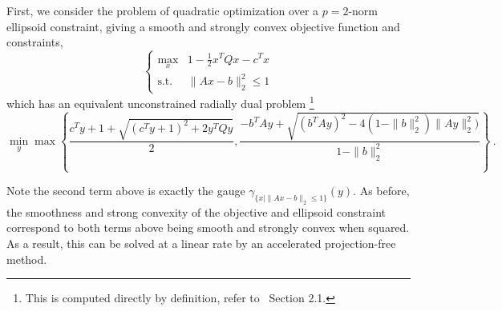 \documentclass[sn-mathphys,Numbered]{sn-jnl}%
\begin{document}


First, we consider the problem of quadratic optimization over a $p=2$-norm ellipsoid constraint, giving a smooth and strongly convex objective function and constraints,
\begin{equation} \label{eq:quad-ellip}
    \begin{cases} \max_x & 1 - \frac{1}{2}x^TQx - c^Tx \\ \text{s.t. } &\|Ax-b\|^2_2\leq 1 \end{cases}
\end{equation}
which has an equivalent unconstrained radially dual problem \footnote{This is computed directly by definition, refer to~\cite{grimmer2023radial2} Section 2.1.}
\begin{equation}
    \min_y \max\left\{ \frac{c^Ty +1 +\sqrt{(c^Ty+1)^2+2y^TQy}}{2}, \frac{-b^TAy + \sqrt{(b^TAy)^2-4(1-\|b\|_2^2)\|Ay\|^2_2)}}{1-\|b\|_2^2} \right\} \ .
\end{equation}

Note the second term above is exactly the gauge $\gamma_{\{x \mid \|Ax-b\|_2\leq 1\}}(y)$. As before, the smoothness and strong convexity of the objective and ellipsoid constraint correspond to both terms above being smooth and strongly convex when squared. As a result, this can be solved at a linear rate by an accelerated projection-free method.

\end{document}
